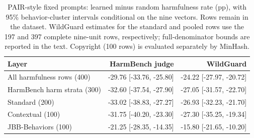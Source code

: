 \begin{table}[t]
\centering\small
\begin{tabular}{lrr}
\toprule
Layer & HarmBench judge & WildGuard \\
\midrule
All harmfulness rows (400) & -29.76 [-33.76, -25.80] & -24.22 [-27.97, -20.72] \\
HarmBench harm strata (300) & -32.60 [-37.54, -27.90] & -27.05 [-31.57, -22.70] \\
Standard (200) & -33.02 [-38.83, -27.27] & -26.93 [-32.23, -21.70] \\
Contextual (100) & -31.75 [-40.20, -23.30] & -27.30 [-35.25, -19.34] \\
JBB-Behaviors (100) & -21.25 [-28.35, -14.35] & -15.80 [-21.65, -10.20] \\
\bottomrule
\end{tabular}
\caption{PAIR-style fixed prompts: learned minus random harmfulness rate (pp), with 95\% behavior-cluster intervals conditional on the nine vectors. Rows remain in the dataset. WildGuard estimates for the standard and pooled rows use the 197 and 397 complete nine-unit rows, respectively; full-denominator bounds are reported in the text. Copyright (100 rows) is evaluated separately by MinHash.}
\label{tab:pair500-primary}
\end{table}
